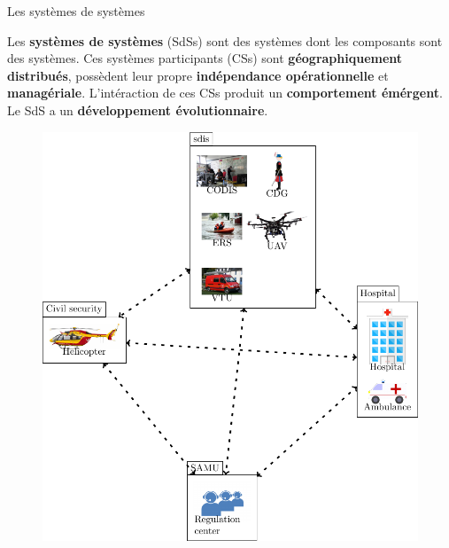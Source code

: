 

\begin{frame}{Les systèmes de systèmes}
\centering 
\begin{block}{}
Les \textbf{systèmes de systèmes} (SdSs) sont des systèmes dont les
composants sont des systèmes. Ces systèmes participants (CSs) sont \textbf{géographiquement
distribués}, possèdent leur propre \textbf{indépendance
opérationnelle} et
\textbf{managériale}. 
L'intéraction de ces CSs produit un \textbf{comportement
émérgent}. Le
SdS a un \textbf{développement évolutionnaire}. 
\end{block}
\begin{figure}
\includegraphics[height=0.5\textwidth]{imgs/fig_sos_overview.pdf}
\end{figure}
\end{frame}

